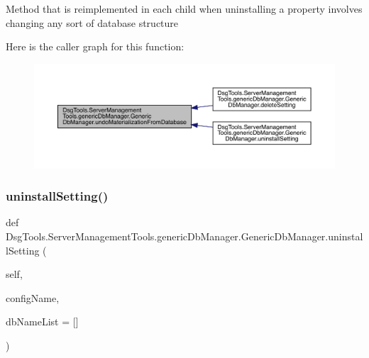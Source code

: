 \begin{DoxyVerb}Method that is reimplemented in each child when uninstalling a property involves changing any sort of database structure
\end{DoxyVerb}
 Here is the caller graph for this function\+:
\nopagebreak
\begin{figure}[H]
\begin{center}
\leavevmode
\includegraphics[width=350pt]{class_dsg_tools_1_1_server_management_tools_1_1generic_db_manager_1_1_generic_db_manager_a6888cc54a692a094b7f0651939bbc852_icgraph}
\end{center}
\end{figure}
\mbox{\label{class_dsg_tools_1_1_server_management_tools_1_1generic_db_manager_1_1_generic_db_manager_a5b45d7939d1ec1d6d4294de4fb84805f}} 
\subsubsection{\texorpdfstring{uninstall\+Setting()}{uninstallSetting()}}
{\footnotesize\ttfamily def Dsg\+Tools.\+Server\+Management\+Tools.\+generic\+Db\+Manager.\+Generic\+Db\+Manager.\+uninstall\+Setting (\begin{DoxyParamCaption}\item[{}]{self,  }\item[{}]{config\+Name,  }\item[{}]{db\+Name\+List = {\ttfamily \mbox{[}\mbox{]}} }\end{DoxyParamCaption})}

